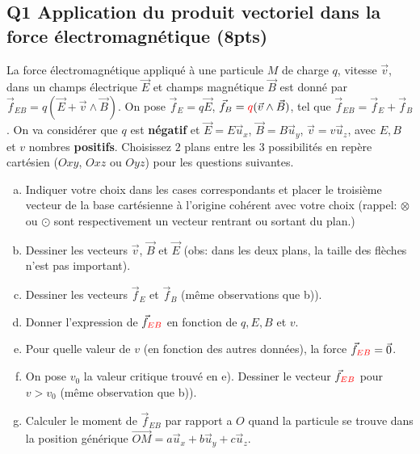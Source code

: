 \documentclass[french,10pt,twocolumn]{article}
\begin{document}
	\FloatBarrier
	
	\subsection*{Q1 Application du produit vectoriel dans la force électromagnétique (8pts)}
	La force électromagnétique appliqué à une particule $M$ de charge $q$, vitesse $\vec{v}$, dans un champs électrique $\vec{E}$ et champs magnétique $\vec{B}$ est donné par $\vec{f}_{EB} = q (\vec{E} + \vec{v} \wedge \vec{B})$. On pose $\vec{f}_E = q \vec{E}$, $\vec{f}_B = { \color{red} q } (\vec{v} \wedge \vec{B})$, tel que $\vec{f}_{EB} = \vec{f}_E + \vec{f}_B$. On va considérer que $q$ est \textbf{négatif} et $\vec{E} = E \vec{u}_x$, $\vec{B} = B \vec{u}_y$, $\vec{v} = v \vec{u}_z$, avec $E, B$ et $v$ nombres \textbf{positifs}. Choisissez $2$ plans entre les $3$ possibilités en repère cartésien ($Oxy$, $Oxz$ ou $Oyz$) pour les questions suivantes. 
	\begin{enumerate}[a)]
		\item Indiquer votre choix dans les cases correspondants et placer le troisième vecteur de la base cartésienne à l'origine cohérent avec votre choix (rappel: $\otimes$ ou $\odot$  sont respectivement un vecteur rentrant ou sortant du plan.) 
		\item Dessiner les vecteurs $\vec{v}$, $\vec{B}$ et $\vec{E}$ (obs: dans les deux plans, la taille des flèches n'est pas important).
		\item Dessiner les vecteurs $\vec{f}_E$ et $\vec{f}_B$ (même observations que b)). 
		\item Donner l'expression de $\vec{f}_{\color{red} 	EB}$ en fonction de $q, E, B$ et $v$.
		\item Pour quelle valeur de $v$ (en fonction des autres données), la force $\vec{f}_{\color{red} EB} = \vec{0}$.
		\item On pose $v_0$ la valeur critique trouvé en e). Dessiner le vecteur $\vec{f}_{\color{red} EB}$ pour $v>v_0$ (même observation que b)).
		\item Calculer le moment de $\vec{f}_{EB}$ par rapport a $O$ quand la particule se trouve dans la position générique $\vec{OM} = a\vec{u}_x + b\vec{u}_y + c\vec{u}_z$.
	\end{enumerate}
	
\end{document}
